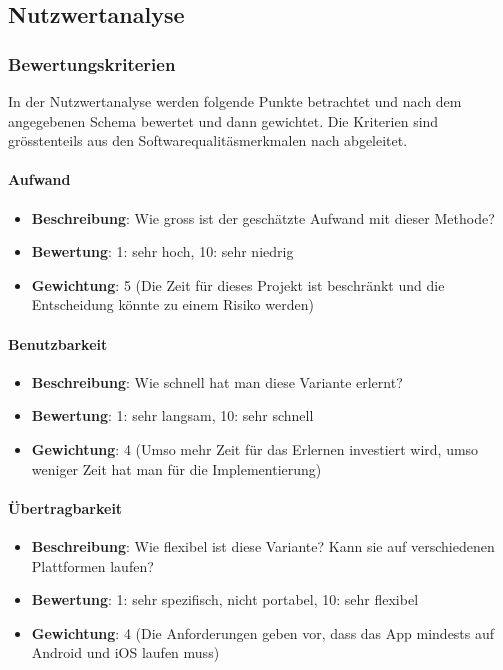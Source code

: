 \newpage
\subsection{Nutzwertanalyse}\label{architektur_nutzwertanalyse}

\subsubsection{Bewertungskriterien}\label{architektur_bewertungspunkte}

In der Nutzwertanalyse werden folgende Punkte betrachtet und nach dem angegebenen Schema bewertet und dann gewichtet. Die Kriterien sind grösstenteils aus den Softwarequalitäsmerkmalen nach \cite{iso_9126} abgeleitet.

\paragraph{Aufwand}
\begin{itemize}
	\item \textbf{Beschreibung}: Wie gross ist der geschätzte Aufwand mit dieser Methode?
	\item \textbf{Bewertung}: 1: sehr hoch, 10: sehr niedrig
	\item \textbf{Gewichtung}: 5 (Die Zeit für dieses Projekt ist beschränkt und die Entscheidung könnte zu einem Risiko werden)
\end{itemize}

\paragraph{Benutzbarkeit}
\begin{itemize}
	\item \textbf{Beschreibung}: Wie schnell hat man diese Variante erlernt? 
	\item \textbf{Bewertung}: 1: sehr langsam, 10: sehr schnell
	\item \textbf{Gewichtung}: 4 (Umso mehr Zeit für das Erlernen investiert wird, umso weniger Zeit hat man für die Implementierung)
\end{itemize}

\paragraph{Übertragbarkeit}
\begin{itemize}
	\item \textbf{Beschreibung}: Wie flexibel ist diese Variante? Kann sie auf verschiedenen Plattformen laufen? 
	\item \textbf{Bewertung}: 1: sehr spezifisch, nicht portabel, 10: sehr flexibel
	\item \textbf{Gewichtung}: 4 (Die Anforderungen geben vor, dass das App mindests auf Android und iOS laufen muss)
\end{itemize}

